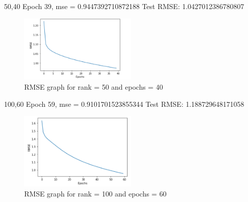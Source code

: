 \documentclass[final]{cvpr}
\begin{document}
50,40
Epoch 39, mse = 0.9447392710872188
Test RMSE: 1.0427012386780807

\begin{figure}[h]
	\includegraphics[width=0.5\textwidth]{./50_40_graph.PNG}
	\caption{RMSE graph for rank = 50 and epochs = 40}
\end{figure}

100,60
Epoch 59, mse = 0.9101701523855344
Test RMSE: 1.188729648171058

\begin{figure}[h]
	\includegraphics[width=0.5\textwidth]{./100_60_graph.PNG}
	\caption{RMSE graph for rank = 100 and epochs = 60}
\end{figure}

\end{document}

